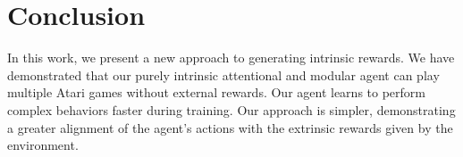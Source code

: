 \section{Conclusion}
\label{sec:conclusion}



In this work, we present a new approach to generating intrinsic rewards. We have demonstrated that our purely intrinsic attentional and modular agent can play multiple Atari games without external rewards. Our agent learns to perform complex behaviors faster during training. Our approach is simpler, demonstrating a greater alignment of the agent's actions with the extrinsic rewards given by the environment. 



